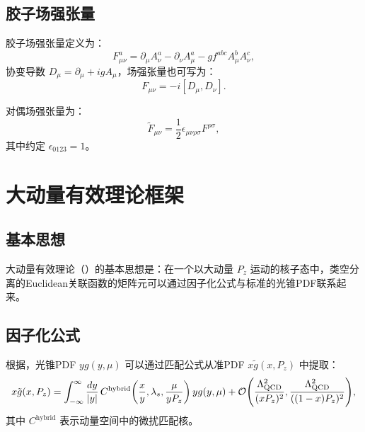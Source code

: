 \documentclass[11pt,a4paper]{article}
\newcommand{\LaMET}{\text{LaMET}}
\newcommand{\Pz}{P_z}
\newcommand{\QCD}{\Lambda_{\text{QCD}}}
\begin{document}
\subsection{胶子场强张量}

胶子场强张量定义为：
\begin{equation}\label{eq:F_def}
    F^a_{\mu\nu} = \partial_\mu A^a_\nu - \partial_\nu A^a_\mu - g f^{abc} A^b_\mu A^c_\nu,
\end{equation}
协变导数 $D_\mu = \partial_\mu + i g A_\mu$，场强张量也可写为：
\begin{equation}
    F_{\mu\nu} = -i [D_\mu, D_\nu].
\end{equation}

对偶场强张量为：
\begin{equation}
    \tilde{F}_{\mu\nu} = \frac{1}{2} \epsilon_{\mu\nu\rho\sigma} F^{\rho\sigma},
\end{equation}
其中约定 $\epsilon_{0123} = 1$。

\section{大动量有效理论框架}

\subsection{基本思想}

大动量有效理论（\LaMET{}）的基本思想是\cite{Ji:2013dva,Ji:2014gla}：在一个以大动量 $P_z$ 运动的核子态中，类空分离的Euclidean关联函数的矩阵元可以通过因子化公式与标准的光锥PDF联系起来。

\subsection{因子化公式}

根据\LaMET{}，光锥PDF $y g(y, \mu)$ 可以通过匹配公式从准PDF $x\tilde{g}(x, \Pz)$ 中提取\cite{Ji:2017oey}：
\begin{equation}\label{eq:matching}
    x\tilde{g}(x, \Pz) = \int_{-\infty}^{\infty} \frac{dy}{|y|} \, C^{\text{hybrid}}\qty(\frac{x}{y}, \lambda_s, \frac{\mu}{y\Pz}) \, y g(y, \mu) + \mathcal{O}\qty(\frac{\QCD^2}{(x\Pz)^2}, \frac{\QCD^2}{((1-x)\Pz)^2}),
\end{equation}
其中 $C^{\text{hybrid}}$ 表示动量空间中的微扰匹配核。
\end{document}
